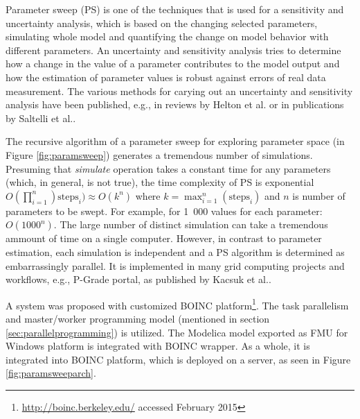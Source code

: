 Parameter sweep (PS) is one of the techniques that is used for a sensitivity and uncertainty analysis, which is based on the changing selected parameters, simulating whole model and quantifying the change on model behavior with different parameters. An uncertainty and sensitivity analysis tries to determine how a change in the value of a parameter  contributes to the model output and how the estimation of parameter values is robust against errors of real data measurement. The various methods for carying out an uncertainty and sensitivity analysis have been published, e.g., in reviews by Helton et al. \cite{Helton2006} or in publications by Saltelli et al.\cite{Saltelli2004,Saltelli2008}. 

The recursive algorithm of a parameter sweep for exploring parameter space (in Figure \ref{fig:paramsweep}) generates a tremendous number of simulations. Presuming that \emph{simulate} operation takes a constant time for any parameters (which, in general, is not true), the time complexity of PS is exponential $O(\prod_{i=1}^{n}) \text{steps}_i) \approx  O(k^n)$ where $k=\max_{i=1}^n(\text{steps}_i)$ and $n$ is number of parameters to be swept. For example, for 1~000 values for each parameter: $O(1000^n)$. The large number of distinct simulation can take a tremendous ammount of time on a single computer. However, in contrast to parameter estimation, each simulation is independent and a PS algorithm is determined as embarrassingly parallel. It is implemented in many grid computing projects and workflows, e.g., P-Grade portal, as published by Kacsuk et al.\cite{Kacsuk2011}.

A system was proposed with customized BOINC platform\cite{Anderson2004}\footnote{\url{http://boinc.berkeley.edu/} accessed February 2015}. The task parallelism and master/worker programming model (mentioned in section \ref{sec:parallelprogramming}) is utilized. The Modelica model exported as FMU for Windows platform is integrated with BOINC wrapper. As a whole, it is integrated into BOINC platform, which is deployed on a server, as seen in Figure \ref{fig:paramsweeparch}. 

